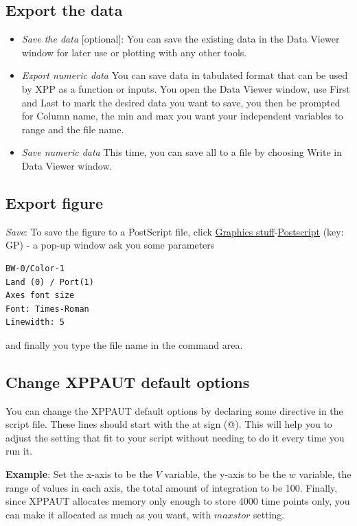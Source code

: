 \subsection{Export the data}
\label{sec:export-data}


\begin{itemize}
\item {\it Save the data} [optional]: You can save the existing data
  in the Data Viewer window for later use or plotting with any other
  tools. 

\item {\it Export numeric data} You can save data in tabulated
format that can be used by XPP as a function or inputs. You open the
Data Viewer window, use First and Last to mark the desired data you
want to save, you then be prompted for Column name, the min and max
you want your independent variables to range and the file name.

\item {\it Save numeric data} This time, you can save all to a
file by choosing Write in Data Viewer window.
\end{itemize}

\subsection{Export figure}
\label{sec:export-figure}


{\it Save}: To save the figure to a PostScript file, click
\underline{Graphics stuff}-\underline{Postscript} (key: GP) - a pop-up
window ask you some parameters

\begin{verbatim}
BW-0/Color-1
Land (0) / Port(1)
Axes font size
Font: Times-Roman
Linewidth: 5
\end{verbatim}
and finally you type the file name in the command area.



\subsection{Change XPPAUT default options}
\label{sec:change-xppa-defa}

You can change the XPPAUT default options by declaring some directive
in the script file. These lines should start with the at sign
(@). This will help you to adjust the setting that fit to your script
without needing to do it every time you run it.

{\bf Example}: Set the x-axis to be the $V$ variable,  the y-axis to
be the $w$ variable, the range of values in each axis, the total
amount of integration to be 100. Finally, since XPPAUT allocates
memory only enough to store 4000 time points only, you can make it
allocated as much as you want, with $maxstor$ setting.

